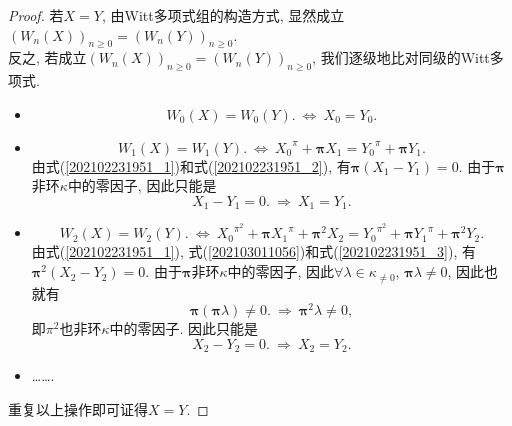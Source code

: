 \documentclass[UTF8, twoside]{ctexart}
\theoremstyle{nonumberplain}
\newtheorem{proof}{\heiti 证明}  %
\theoremstyle{nonumberplain}
\theoremstyle{plain}
\begin{document}
	\begin{proof}
		若$X=Y$, 由Witt多项式组的构造方式, 显然成立${{\left( {{W}_{n}}\left( X \right) \right)}_{n\ge 0}}={{\left( {{W}_{n}}\left( Y \right) \right)}_{n\ge 0}}$. \\
		反之, 若成立${{\left( {{W}_{n}}\left( X \right) \right)}_{n\ge 0}}={{\left( {{W}_{n}}\left( Y \right) \right)}_{n\ge 0}}$, 我们逐级地比对同级的Witt多项式.
		\vskip 0.3cm
		\begin{itemize}
			\item 
			\begin{equation} \label{202102231951_1}
				{{W}_{0}}\left( X \right)={{W}_{0}}\left( Y \right).
				\ \Longleftrightarrow \ 
				{{X}_{0}}={{Y}_{0}}.
			\end{equation}
			\vskip 0.3cm
			
			\item 
			\begin{equation} \label{202102231951_2}
				{{W}_{1}}\left( X \right)={{W}_{1}}\left( Y \right).
				\ \Longleftrightarrow \ 
				{{X}_{0}}^{\pi }+\bm{\pi} {{X}_{1}}={{Y}_{0}}^{\pi }+\bm{\pi} {{Y}_{1}}.
			\end{equation}
			由式(\ref{202102231951_1})和式(\ref{202102231951_2}), 有$\bm{\pi} \left( {{X}_{1}}-{{Y}_{1}} \right)=0.$
			由于$\bm{\pi}$非环$\kappa $中的零因子, 因此只能是
			\begin{equation} \label{202103011056}
				{{X}_{1}}-{{Y}_{1}}=0.
				\ \Longrightarrow \ 
				{{X}_{1}}={{Y}_{1}}.
			\end{equation}
			\vskip 0.3cm
			
			\item 
			\begin{equation} \label{202102231951_3}
				{{W}_{2}}\left( X \right)={{W}_{2}}\left( Y \right).
				\ \Longleftrightarrow \ 
				{{X}_{0}}^{{{\pi }^{2}}}+\bm{\pi} {{X}_{1}}^{\pi }+{\bm{\pi }^{2}}{{X}_{2}}={{Y}_{0}}^{{{\pi }^{2}}}+\bm{\pi} {{Y}_{1}}^{\pi }+{\bm{\pi }^{2}}{{Y}_{2}}.
			\end{equation}
			由式(\ref{202102231951_1}), 式(\ref{202103011056})和式(\ref{202102231951_3}), 有${\bm{\pi }^{2}}\left( {{X}_{2}}-{{Y}_{2}} \right)=0$. 
			由于$\bm{\pi}$非环$\kappa$中的零因子, 因此$\forall \lambda \in {{\kappa }_{\ne 0}}$, $\bm{\pi} \lambda \ne 0$, 因此也就有
			\[
				\bm{\pi} \left( \bm{\pi} \lambda  \right)\ne 0.
				\ \Longrightarrow \ 
				{\bm{\pi }^{2}}\lambda \ne 0,
			\]
			即${{\pi }^{2}}$也非环$\kappa $中的零因子.
			因此只能是
			\[
				{{X}_{2}}-{{Y}_{2}}=0.
				\ \Longrightarrow \ 
				{{X}_{2}}={{Y}_{2}}.
			\]
			\vskip 0.3cm
			
			\item \ldots \ldots.
		\end{itemize}
		\vskip 0.3cm
		重复以上操作即可证得$X=Y$.
	\end{proof}
	\vskip 0.5cm
	
\end{document}
